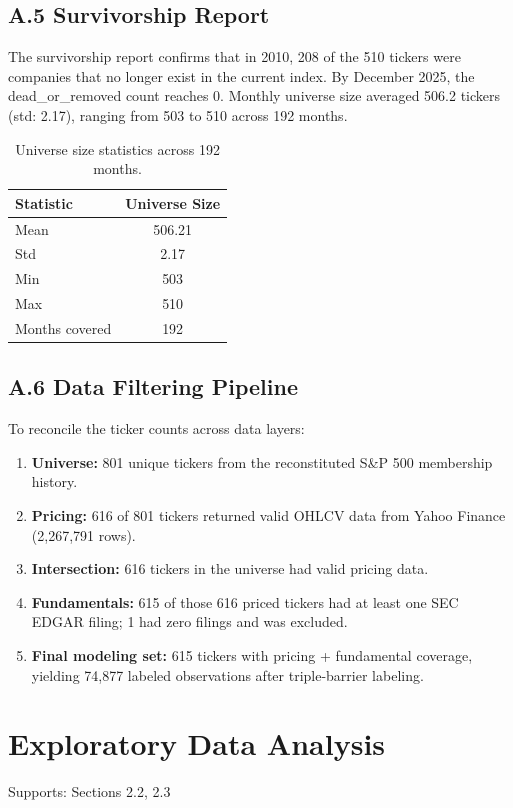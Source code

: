 \documentclass[11pt, a4paper]{article}
\begin{document}
\subsection*{A.5 Survivorship Report}
The survivorship report confirms that in 2010, 208 of the 510 tickers were companies that no longer exist in the current index. By December 2025, the dead\_or\_removed count reaches 0. Monthly universe size averaged 506.2 tickers (std: 2.17), ranging from 503 to 510 across 192 months.

\begin{table}[h]
\centering
\begin{tabular}{lc}
\toprule
\textbf{Statistic} & \textbf{Universe Size} \\
\midrule
Mean & 506.21 \\
Std & 2.17 \\
Min & 503 \\
Max & 510 \\
Months covered & 192 \\
\bottomrule
\end{tabular}
\caption{Universe size statistics across 192 months.}
\end{table}

\subsection*{A.6 Data Filtering Pipeline}
To reconcile the ticker counts across data layers:
\begin{enumerate}
    \item \textbf{Universe:} 801 unique tickers from the reconstituted S\&P 500 membership history.
    \item \textbf{Pricing:} 616 of 801 tickers returned valid OHLCV data from Yahoo Finance (2,267,791 rows).
    \item \textbf{Intersection:} 616 tickers in the universe had valid pricing data.
    \item \textbf{Fundamentals:} 615 of those 616 priced tickers had at least one SEC EDGAR filing; 1 had zero filings and was excluded.
    \item \textbf{Final modeling set:} 615 tickers with pricing + fundamental coverage, yielding 74,877 labeled observations after triple-barrier labeling.
\end{enumerate}

\clearpage
\section{Exploratory Data Analysis}
Supports: Sections 2.2, 2.3
\end{document}
